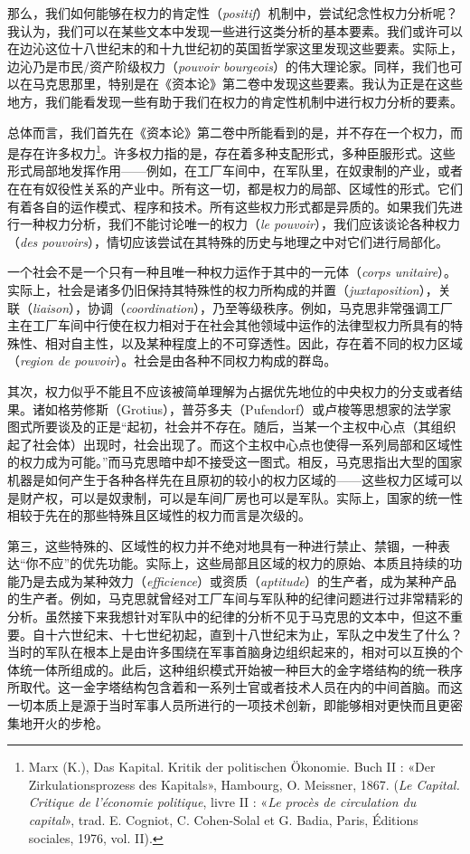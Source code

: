 \documentclass[fontset=fandol, a4paper, 12pt, twoside]{ctexart}
\newcommand{\fr}[1]{\textit{#1}}
\begin{document}
那么，我们如何能够在权力的肯定性（\fr{positif}）机制中，尝试纪念性权力分析呢？我认为，我们可以在某些文本中发现一些进行这类分析的基本要素。我们或许可以在边沁这位十八世纪末的和十九世纪初的英国哲学家这里发现这些要素。实际上，边沁乃是市民/资产阶级权力（\fr{pouvoir bourgeois}）的伟大理论家。同样，我们也可以在马克思那里，特别是在《资本论》第二卷中发现这些要素。我认为正是在这些地方，我们能看发现一些有助于我们在权力的肯定性机制中进行权力分析的要素。

总体而言，我们首先在《资本论》第二卷中所能看到的是，并不存在一个权力，而是存在许多权力\footnote{Marx (K.), Das Kapital. Kritik der politischen Ökonomie. Buch II : «Der Zirkulationsprozess des Kapitals», Hambourg, O. Meissner, 1867. (\fr{Le Capital. Critique de l'économie politique}, livre II : «\fr{Le procès de circulation du capital}», trad. E. Cogniot, C. Cohen-Solal et G. Badia, Paris, Éditions sociales, 1976, vol. II).}。许多权力指的是，存在着多种支配形式，多种臣服形式。这些形式局部地发挥作用——例如，在工厂车间中，在军队里，在奴隶制的产业，或者在在有奴役性关系的产业中。所有这一切，都是权力的局部、区域性的形式。它们有着各自的运作模式、程序和技术。所有这些权力形式都是异质的。如果我们先进行一种权力分析，我们不能讨论唯一的权力（\fr{le pouvoir}），我们应该谈论各种权力（\fr{des pouvoirs}），情切应该尝试在其特殊的历史与地理之中对它们进行局部化。

一个社会不是一个只有一种且唯一种权力运作于其中的一元体（\fr{corps unitaire}）。实际上，社会是诸多仍旧保持其特殊性的权力所构成的并置（\fr{juxtaposition}），关联（\fr{liaison}），协调（\fr{coordination}），乃至等级秩序。例如，马克思非常强调工厂主在工厂车间中行使在权力相对于在社会其他领域中运作的法律型权力所具有的特殊性、相对自主性，以及某种程度上的不可穿透性。因此，存在着不同的权力区域（\fr{region de pouvoir}）。社会是由各种不同权力构成的群岛。

其次，权力似乎不能且不应该被简单理解为占据优先地位的中央权力的分支或者结果。诸如格劳修斯（Grotius），普芬多夫（Pufendorf）或卢梭等思想家的法学家图式所要谈及的正是“起初，社会并不存在。随后，当某一个主权中心点（其组织起了社会体）出现时，社会出现了。而这个主权中心点也使得一系列局部和区域性的权力成为可能。”而马克思暗中却不接受这一图式。相反，马克思指出大型的国家机器是如何产生于各种各样先在且原初的较小的权力区域的——这些权力区域可以是财产权，可以是奴隶制，可以是车间厂房也可以是军队。实际上，国家的统一性相较于先在的那些特殊且区域性的权力而言是次级的。

第三，这些特殊的、区域性的权力并不绝对地具有一种进行禁止、禁锢，一种表达“你不应”的优先功能。实际上，这些局部且区域的权力的原始、本质且持续的功能乃是去成为某种效力（\fr{efficience}）或资质（\fr{aptitude}）的生产者，成为某种产品的生产者。例如，马克思就曾经对工厂车间与军队种的纪律问题进行过非常精彩的分析。虽然接下来我想针对军队中的纪律的分析不见于马克思的文本中，但这不重要。自十六世纪末、十七世纪初起，直到十八世纪末为止，军队之中发生了什么？当时的军队在根本上是由许多围绕在军事首脑身边组织起来的，相对可以互换的个体统一体所组成的。此后，这种组织模式开始被一种巨大的金字塔结构的统一秩序所取代。这一金字塔结构包含着和一系列士官或者技术人员在内的中间首脑。而这一切本质上是源于当时军事人员所进行的一项技术创新，即能够相对更快而且更密集地开火的步枪。
\end{document}
